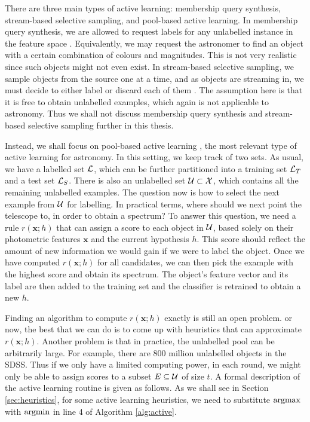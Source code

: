 There are three main types of active learning: membership query synthesis, stream-based selective
sampling, and pool-based active learning. In membership query synthesis, we are allowed to request
labels for any unlabelled instance in the feature space \cite{angluin88}. Equivalently, we may
request the astronomer to find an object with a certain combination of colours and magnitudes. This
is not very realistic since such objects might not even exist. In stream-based selective sampling,
we sample objects from the source one at a time, and as objects are streaming in, we must decide to
either label or discard each of them \cite{cohn94}. The assumption here is that it is free to obtain
unlabelled examples, which again is not applicable to astronomy. Thus we shall not discuss membership
query synthesis and stream-based selective sampling further in this thesis.

Instead, we shall focus on pool-based active learning \cite{lewis94}, the most relevant type of
active learning for astronomy. In this setting, we keep track of two sets. As usual, we have a
labelled set $\mathcal{L}$, which can be further partitioned into a training set $\mathcal{L}_T$ and a
test set $\mathcal{L}_S$. There is also an unlabelled set $\mathcal{U} \subset \mathcal{X}$, which contains
all the remaining unlabelled examples. The question now is how to select the next example from
$\mathcal{U}$ for labelling. In practical terms, where should we next point the telescope to, in
order to obtain a spectrum? To answer this question, we need a rule $r(\bm{x}; h)$ that can assign
a score to each object in $\mathcal{U}$, based solely on their photometric features $\bm{x}$ and
the current hypothesis $h$. This score should reflect the amount of new information we would gain
if we were to label the object. Once we have computed $r(\bm{x}; h)$ for all candidates, we can
then pick the example with the highest score and obtain its spectrum. The object's feature vector
and its label are then added to the training set and the classifier is retrained to obtain a new
$h$.

Finding an algorithm to compute $r(\bm{x}; h)$ exactly is still an open problem. or now, the best
that we can do is to come up with heuristics that can approximate $r(\bm{x}; h)$. Another problem
is that in practice, the unlabelled pool can be arbitrarily large. For example, there are 800
million unlabelled objects in the SDSS. Thus if we only have a limited computing power, in each
round, we might only be able to assign scores to a subset $E \subseteq \mathcal{U}$ of size $t$. A
formal description of the active learning routine is given as follows. As we shall see in Section
\ref{sec:heuristics}, for some active learning heuristics, we need to substitute $\argmax$ with
$\argmin$ in line 4 of Algorithm \ref{alg:active}.

